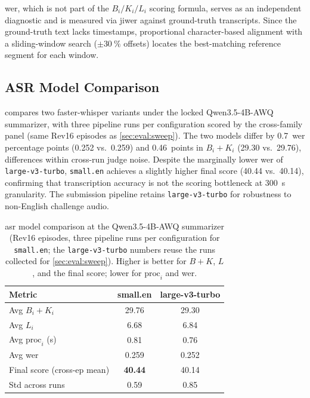 \documentclass[conference,letterpaper]{IEEEtran}
\begin{document}
\Gls{wer}, which is not part of the $B_i / K_i / L_i$ scoring formula, serves as an independent diagnostic and is measured via jiwer against ground-truth transcripts.
Since the ground-truth text lacks timestamps, proportional character-based alignment with a sliding-window search ($\pm\SI{30}{\percent}$ offsets) locates the best-matching reference segment for each window.

\subsection{ASR Model Comparison}
\label{sec:eval:asr}

 compares two faster-whisper variants under the locked Qwen3.5-4B-AWQ summarizer, with three pipeline runs per configuration scored by the cross-family panel (same Rev16 episodes as \cref{sec:eval:sweep}).
The two models differ by \num{0.7}~\gls{wer} percentage points (\num{0.252} vs.\ \num{0.259}) and \num{0.46}~points in $B_i + K_i$ (\num{29.30} vs.\ \num{29.76}), differences within cross-run judge noise.
Despite the marginally lower \gls{wer} of \texttt{large-v3-turbo}, \texttt{small.en} achieves a slightly higher final score (\num{40.44} vs.\ \num{40.14}), confirming that transcription accuracy is not the scoring bottleneck at \SI{300}{\second} granularity.
The submission pipeline retains \texttt{large-v3-turbo} for robustness to non-English challenge audio.

\begin{table}[htb!]
    \centering
    \caption{\gls{asr} model comparison at the Qwen3.5-4B-AWQ summarizer
        (Rev16 episodes, three pipeline runs per configuration for \texttt{small.en};
        the \texttt{large-v3-turbo} numbers reuse the runs collected for
        \cref{sec:eval:sweep}). Higher is better for $B + K$, $L$, and the final
        score; lower for $\text{proc}_i$ and \gls{wer}.}
    \label{tab:asr-comparison}
    \small
    \begin{tabularx}{0.85\columnwidth}{@{}X S S@{}}
        \toprule
        \textbf{Metric}             & \textbf{small.en}    & \textbf{large-v3-turbo} \\
        \midrule
        Avg $B_i + K_i$             & \num{29.76}          & \num{29.30}             \\
        Avg $L_i$                   & \num{6.68}           & \num{6.84}              \\
        Avg $\text{proc}_i$ (s)     & \num{0.81}           & \num{0.76}              \\
        Avg \gls{wer}               & \num{0.259}          & \num{0.252}             \\
        Final score (cross-ep mean) & \textbf{\num{40.44}} & \num{40.14}             \\
        Std across runs             & \num{0.59}           & \num{0.85}              \\
        \bottomrule
    \end{tabularx}
\end{table}
\end{document}
